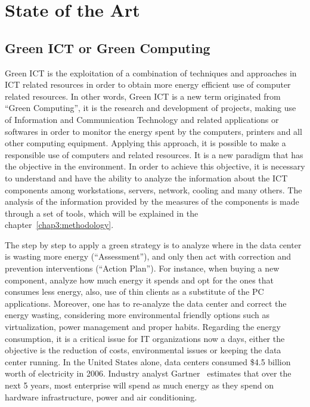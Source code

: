 

\chapter{State of the Art} \label{chap2:state_of_the_art}
    \section{Green ICT or Green Computing} \label{sec2:green_ict}
        Green ICT is the exploitation of a combination of techniques and approaches in ICT related resources in order to obtain more energy efficient use of computer related resources. In other words, Green ICT is a new term originated from ``Green Computing'', it is the research and development of projects, making use of Information and Communication Technology and related applications or softwares in order to monitor the energy spent by the computers, printers and all other computing equipment. Applying this approach, it is possible to make a responsible use of computers and related resources. It is a new paradigm that has the objective in the environment. In order to achieve this objective, it is necessary to understand and have the ability to analyze the information about the ICT components among workstations, servers, network, cooling and many others. The analysis of the information provided by the measures of the components is made through a set of tools, which will be explained in the chapter~\ref{chap3:methodology}. 
        
        The step by step to apply a green strategy is to analyze where in the data center is wasting more energy (``Assessment''), and only then act with correction and prevention interventions (``Action Plan''). For instance, when buying a new component, analyze how much energy it spends and opt for the ones that consumes less energy, also, use of thin clients as a substitute of the PC applications. Moreover, one has to re-analyze the data center and correct the energy wasting, considering more environmental friendly options such as virtualization, power management and proper habits. Regarding the energy consumption, it is a critical issue for IT organizations now a days, either the objective is the reduction of costs, environmental issues or keeping the data center running. In the United States alone, data centers consumed \$4.5 billion worth of electricity in 2006. Industry analyst Gartner~\cite{GartnetKumar07} estimates that over the next 5 years, most enterprise will spend as much energy as they spend on hardware infrastructure, power and air conditioning.
        
